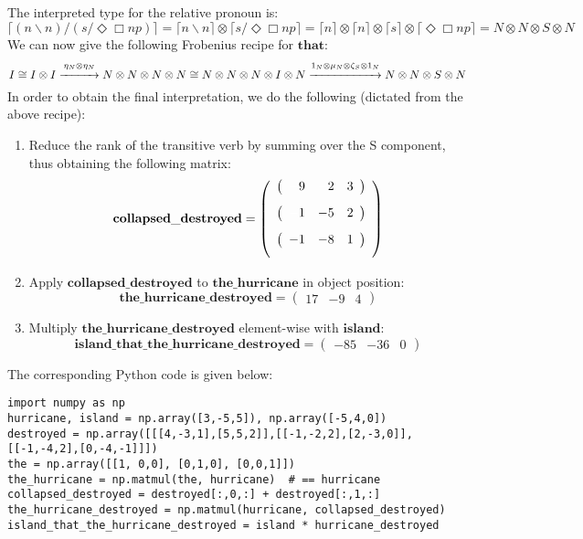 \documentclass[]{article}
\newcommand{\Wv}[1]{\mathbf{#1}}
\newcommand{\bs}{\backslash}
\newcommand{\F}[1]{\lceil #1 \rceil}
\begin{document}
\subsection{}
The interpreted type for the relative pronoun is:
\[ \F{(n\bs n)/(s/\Diamond\Box np)} = \F{n\bs n} \otimes \F{s/\Diamond\Box np} = 
\F{n} \otimes \F{n} \otimes \F{s} \otimes \F{\Diamond\Box np} =
N \otimes N \otimes S \otimes N \]
We can now give the following Frobenius recipe for $\Wv{that}$:
\[ I \cong I \otimes I \overset{\eta_N \otimes \eta_N}{\xrightarrow{\hspace*{1cm}}} N \otimes N \otimes N \otimes N \cong N \otimes N \otimes N \otimes I \otimes N \overset{1_N \otimes \mu_N \otimes \zeta_S \otimes 1_N}{\xrightarrow{\hspace*{2cm}}} N \otimes N \otimes S \otimes N \] 
In order to obtain the final interpretation, we do the following (dictated from the above recipe):
\begin{enumerate}
\item Reduce the rank of the transitive verb by summing over the S component, thus obtaining the following matrix:
\[
\Wv{collapsed\_destroyed} =
\left(\begin{array}{ccc}
\left(\begin{array}{rrr}\textcolor{white}{-}9 & \textcolor{white}{-}2 & 3 \end{array}\right)\\[2ex]
\left(\begin{array}{rrr}\textcolor{white}{-}1 & -5 & 2 \end{array}\right)\\[2ex]
\left(\begin{array}{rrr}-1 & -8 & 1 \end{array}\right)\\[2ex]
\end{array}
\right)
\]
\item Apply $\Wv{collapsed\_destroyed}$ to $\Wv{the\_hurricane}$ in object position:
\[
\Wv{the\_hurricane\_destroyed} =
\left(\begin{array}{ccc} 17 & -9 & 4 \end{array}\right)
\]
\item Multiply $\Wv{the\_hurricane\_destroyed}$ element-wise with $\Wv{island}$:
\[
\Wv{island\_that\_the\_hurricane\_destroyed} =
\left(\begin{array}{ccc} -85 & -36 & 0 \end{array}\right)
\]
\end{enumerate}
The corresponding Python code is given below:
\begin{verbatim}
import numpy as np
hurricane, island = np.array([3,-5,5]), np.array([-5,4,0])
destroyed = np.array([[[4,-3,1],[5,5,2]],[[-1,-2,2],[2,-3,0]], [[-1,-4,2],[0,-4,-1]]])
the = np.array([[1, 0,0], [0,1,0], [0,0,1]])
the_hurricane = np.matmul(the, hurricane)  # == hurricane
collapsed_destroyed = destroyed[:,0,:] + destroyed[:,1,:]
the_hurricane_destroyed = np.matmul(hurricane, collapsed_destroyed)
island_that_the_hurricane_destroyed = island * hurricane_destroyed
\end{verbatim}
\end{document}
